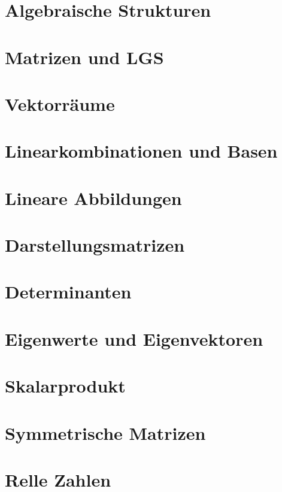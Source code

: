 \documentclass[]{article}
\begin{document}
\newtheorem{definition}{Definition}
\newtheorem{satz}{Satz}

\section{Algebraische Strukturen}

\section{Matrizen und LGS}

\section{Vektorräume}

\section{Linearkombinationen und Basen}

\section{Lineare Abbildungen}

\section{Darstellungsmatrizen}

\section{Determinanten}

\section{Eigenwerte und Eigenvektoren}

\section{Skalarprodukt}

\pagebreak

\section{Symmetrische Matrizen}

\pagebreak


\section{Relle Zahlen}
\end{document}
